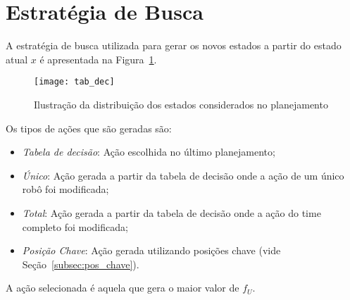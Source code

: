 \section{Estratégia de Busca}\label{sec:est_busca}

A estratégia de busca utilizada para gerar os novos estados a partir do estado
atual $x$ é apresentada na Figura~\ref{fig:estr_busca}.

\begin{figure}[H]
  \centering
  \texttt{[image: tab\_dec]}
  \caption{Ilustração da distribuição dos estados
           considerados no planejamento}\label{fig:estr_busca}
\end{figure}

Os tipos de ações que são geradas são:
\begin{itemize}
  \item \textit{Tabela de decisão}: Ação escolhida no último planejamento;
  \item \textit{Único}: Ação gerada a partir da tabela de decisão onde a ação de
    um único robô foi modificada;
  \item \textit{Total}: Ação gerada a partir da tabela de decisão onde a ação do
    time completo foi modificada;
  \item \textit{Posição Chave}: Ação gerada utilizando posições chave (vide
    Seção~\ref{subsec:pos_chave}).
\end{itemize}

A ação selecionada é aquela que gera o maior valor de $f_U$.





